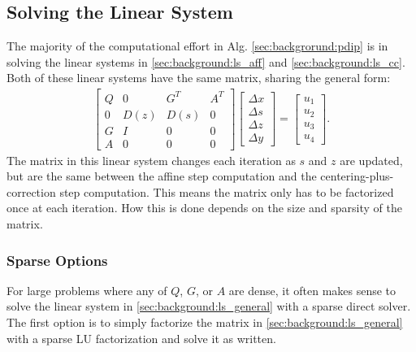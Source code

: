 \subsection{Solving the Linear System}
\label{sec:background:solve_ls}
%
%
The majority of the computational effort in Alg. \ref{sec:backgrorund:pdip} is in solving the linear systems in \eqref{sec:background:ls_aff} and \eqref{sec:background:ls_cc}. Both of these linear systems have the same matrix, sharing the general form:
\begin{align}
    \begin{bmatrix}
        Q & 0 & G^{T} & A^{T} \\
        0 & D(z) & D(s) & 0 \\
        G & I & 0 & 0 \\
        A & 0 & 0 & 0
    \end{bmatrix} 
    \begin{bmatrix}
        \Delta x \\
        \Delta s \\
        \Delta z \\
        \Delta y
    \end{bmatrix}
    = \begin{bmatrix}
        u_1 \\ u_2 \\ u_3 \\ u_4
        \end{bmatrix}. \label{sec:background:ls_general}
\end{align}
The matrix in this linear system changes each iteration as $s$ and $z$ are updated, but are the same between the affine step computation and the centering-plus-correction step computation. This means the matrix only has to be factorized once at each iteration. How this is done depends on the size and sparsity of the matrix.
%
\subsubsection{Sparse Options}
%
For large problems where any of $Q$, $G$, or $A$ are dense, it often makes sense to solve the linear system in \eqref{sec:background:ls_general} with a sparse direct solver. The first option is to simply factorize the matrix in \eqref{sec:background:ls_general} with a sparse LU factorization and solve it as written. 

